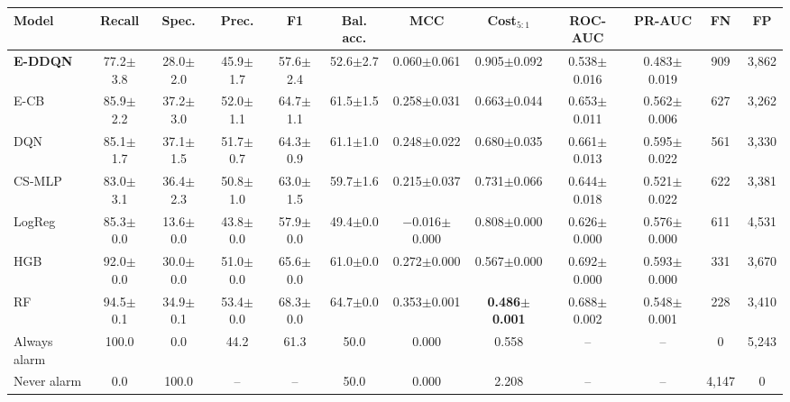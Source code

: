 \begin{tabular}{lccccccccccc}
\toprule
Model & Recall & Spec. & Prec. & F1 & Bal. acc. & MCC & Cost$_{5:1}$ & ROC-AUC & PR-AUC & FN & FP \\
\midrule
\textbf{E-DDQN} & 77.2$\pm$3.8 & 28.0$\pm$2.0 & 45.9$\pm$1.7 & 57.6$\pm$2.4 & 52.6$\pm$2.7 & 0.060$\pm$0.061 & 0.905$\pm$0.092 & 0.538$\pm$0.016 & 0.483$\pm$0.019 & 909 & 3,862 \\
E-CB & 85.9$\pm$2.2 & 37.2$\pm$3.0 & 52.0$\pm$1.1 & 64.7$\pm$1.1 & 61.5$\pm$1.5 & 0.258$\pm$0.031 & 0.663$\pm$0.044 & 0.653$\pm$0.011 & 0.562$\pm$0.006 & 627 & 3,262 \\
DQN & 85.1$\pm$1.7 & 37.1$\pm$1.5 & 51.7$\pm$0.7 & 64.3$\pm$0.9 & 61.1$\pm$1.0 & 0.248$\pm$0.022 & 0.680$\pm$0.035 & 0.661$\pm$0.013 & 0.595$\pm$0.022 & 561 & 3,330 \\
CS-MLP & 83.0$\pm$3.1 & 36.4$\pm$2.3 & 50.8$\pm$1.0 & 63.0$\pm$1.5 & 59.7$\pm$1.6 & 0.215$\pm$0.037 & 0.731$\pm$0.066 & 0.644$\pm$0.018 & 0.521$\pm$0.022 & 622 & 3,381 \\
LogReg & 85.3$\pm$0.0 & 13.6$\pm$0.0 & 43.8$\pm$0.0 & 57.9$\pm$0.0 & 49.4$\pm$0.0 & $-$0.016$\pm$0.000 & 0.808$\pm$0.000 & 0.626$\pm$0.000 & 0.576$\pm$0.000 & 611 & 4,531 \\
HGB & 92.0$\pm$0.0 & 30.0$\pm$0.0 & 51.0$\pm$0.0 & 65.6$\pm$0.0 & 61.0$\pm$0.0 & 0.272$\pm$0.000 & 0.567$\pm$0.000 & 0.692$\pm$0.000 & 0.593$\pm$0.000 & 331 & 3,670 \\
RF & 94.5$\pm$0.1 & 34.9$\pm$0.1 & 53.4$\pm$0.0 & 68.3$\pm$0.0 & 64.7$\pm$0.0 & 0.353$\pm$0.001 & \textbf{0.486$\pm$0.001} & 0.688$\pm$0.002 & 0.548$\pm$0.001 & 228 & 3,410 \\
\midrule
Always alarm & 100.0 & 0.0 & 44.2 & 61.3 & 50.0 & 0.000 & 0.558 & -- & -- & 0 & 5,243 \\
Never alarm & 0.0 & 100.0 & -- & -- & 50.0 & 0.000 & 2.208 & -- & -- & 4,147 & 0 \\
\bottomrule
\end{tabular}
